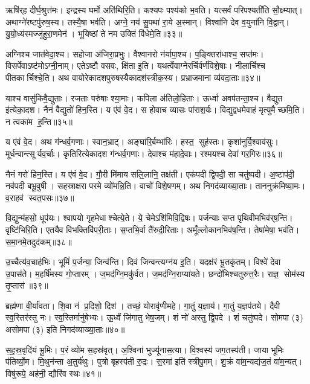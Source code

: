 ऋषि॑र्‌ह दीर्घ॒श्रुत्त॑मः। इन्द्रस्य घर्मो अति॑थिरि॒ति। 
कश्यपः पश्य॑को भ॒वति। यत्सर्वं परिपश्यती॑ति सौ॒क्ष्म्यात्‌। 
अथाग्ने॑रष्टपु॑रुष॒स्य। तस्यै॒षा भव॑ति। 
अग्ने॒ नय॑ सु॒पथा॑ रा॒ये अ॒स्मान्‌। विश्वा॑नि देव व॒युना॑नि वि॒द्वान्‌। 
यु॒यो॒ध्य॑स्मज्जु॑हुरा॒णमेन॑। भूयिष्ठां ते नम उक्तिं वि॑धेमे॒ति॥३३॥\anuvakamend


अग्निश्च जात॑वेदा॒श्च। सहोजा अ॑जिरा॒प्रभुः। वैश्वानरो न॑र्यापा॒श्च। 
प॒ङ्क्तिरा॑धाश्च॒ सप्त॑मः। विसर्पेवाऽष्ट॑मोऽग्नी॒नाम्‌। 
एतेऽष्टौ वसवः, क्षि॑ता इ॒ति। यथर्त्वेवाग्नेरर्चिर्वर्ण॑विशे॒षाः। 
नीलार्चिश्च पीतकार्चिश्चे॒ति। अथ वायोरेकादशपुरुषस्यैका\-दश॑स्त्रीक॒स्य। 
प्रभ्राजमाना व्य॑वदा॒ताः॥३४॥


याश्च वासु॑किवै॒द्युताः। रजताः परु॑षाः श्या॒माः। कपिला अ॑तिलो॒हिताः। 
ऊर्ध्वा अवप॑तन्ता॒श्च। वैद्युत इ॑त्येका॒दश। नैनं वैद्युतो॑ हिन॒स्ति। 
य ए॑वं वे॒द। स होवाच व्यासः पा॑राश॒र्यः। 
विद्युद्वधमेवाहं मृत्युमैच्छमि॒ति। न त्वका॑म ह॒न्ति॥३५॥


य ए॑वं वे॒द। अथ ग॑न्धर्व॒गणाः। स्वान॒भ्राट्‌। 
अङ्घा॑रि॒र्बम्भा॑रिः। हस्त॒ सुह॑स्तः। कृशा॑नुर्वि॒श्वाव॑सुः। 
मूर्धन्वान्त्सूर्यव॒र्चाः। कृतिरित्येकादश ग॑न्धर्व॒गणाः। 
देवाश्च म॑हादे॒वाः। रश्मयश्च देवा॑ गर॒गिरः॥३६॥


नैनं गरो॑ हिन॒स्ति। य ए॑वं वे॒द। 
गौ॒री मि॑माय सलि॒लानि॒ तक्ष॑ती। एक॑पदी द्वि॒पदी॒ सा चतु॑ष्पदी। 
अ॒ष्टाप॑दी॒ नव॑पदी बभू॒वुषी। सहस्राक्षरा परमे व्यो॑मन्नि॒ति। 
वाचो॑ विशे॒षणम्‌। अथ निगद॑व्याख्या॒ताः। 
ताननुक्र॑मिष्या॒मः। व॒राहव॑ स्वत॒पसः॥३७॥

वि॒द्युन्म॑हसो॒ धूप॑यः। श्वापयो गृहमेधाश्चेत्ये॒ते। 
ये॒ चेमेऽशि॑मिवि॒\-द्विषः। पर्जन्याः सप्त पृथिवीमभिव॑र्‌ष॒न्ति। 
वृष्टि॑भिरि॒ति। एतयैव विभक्तिवि॑परी॒ताः। स॒प्तभि॒र्वा तै॑रुदी॒रिताः। 
अमूँल्लोकान\-भिव॑\ur{}ष॒न्ति। तेषा॑मेषा॒ भव॑ति। स॒मा॒नमे॒तदुद॑कम्‌॥३८॥

उ॒च्चैत्य॑व॒चाह॑भिः। भूमिं॑ प॒र्जन्या॒ जिन्व॑न्ति। दिवं जिन्वन्त्यग्न॑य इ॒ति। 
यदक्ष॑रं भू॒तकृ॑तम्‌। विश्वे॑ देवा उ॒पास॑ते। म॒हर्\mbox{}षि॑मस्य गो॒प्तारम्। 
ज॒मद॑ग्नि॒मकु॑र्वत। ज॒मद॑ग्नि॒राप्या॑यते। 
छन्दो॑भिश्चतुरुत्त॒रैः। राज्ञ॒ सोम॑स्य तृ॒प्तास॑॥३९॥

ब्रह्म॑णा वी॒र्या॑वता। शि॒वा न॑ प्र॒दिशो॒ दिश॑। 
तच्छं॒ योरावृ॑णीमहे। गा॒तुं य॒ज्ञाय॑। गा॒तुं य॒ज्ञप॑तये। 
दैवी स्व॒स्तिर॑स्तु नः। स्व॒स्तिर्मानु॑षेभ्यः। ऊ॒र्ध्वं जि॑गातु भेष॒जम्। 
शं नो॑ अस्तु द्वि॒पदे। शं चतु॑ष्पदे। 
सोमपा (३) असोमपा (३) इति निगद॑व्याख्या॒ताः॥४०॥\anuvakamend


स॒ह॒स्र॒वृदि॑यं भू॒मिः। प॒रं व्यो॑म स॒हस्र॑वृत्‌। अ॒श्विना॑ भुज्यू॑नास॒त्या। 
वि॒श्वस्य॑ जग॒तस्प॑ती। जाया भूमिः प॑तिर्व्यो॒म। मि॒थुन॑न्ता अ॒तुर्य॑थुः। 
पुत्रो बृहस्प॑ती रु॒द्रः। स॒रमा॑ इति॑ स्त्रीपु॒मम्‌। 
शु॒क्रं वा॑म॒न्यद्य॑ज॒तं वा॑म॒न्यत्‌। विषु॑रूपे॒ अह॑नी॒ द्यौरि॑व स्थः॥४१॥



